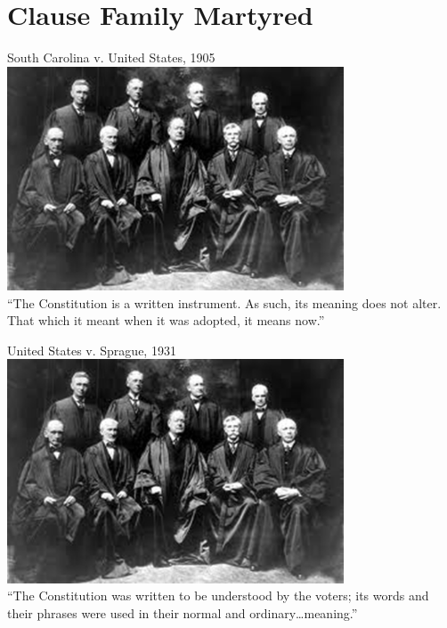 



\unitlength=1pt

\section{Clause Family Martyred}
\frame{\sectionpage}

\begin{frame}{South Carolina v. United States, 1905}
    \centering
    \includegraphics[width=0.75\textwidth]{img/sc-1905.png} \\
    ``The Constitution is a written instrument. As such, its meaning does not alter. That which it meant when it was adopted, it means now.'' \\
\end{frame}

\begin{frame}{United States v. Sprague, 1931}
    \centering
    \includegraphics[width=0.75\textwidth]{img/sc-1905.png} \\
    ``The Constitution was written to be understood by the voters; its words and their phrases were used in their normal and ordinary\ldots meaning.'' \\
\end{frame}

